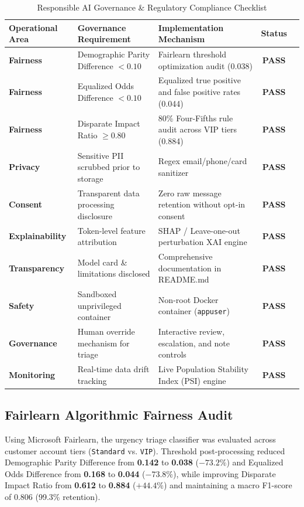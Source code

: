 \documentclass[11pt, a4paper]{article}
\begin{document}
\begin{table}[H]
\centering
\caption{Responsible AI Governance \& Regulatory Compliance Checklist}
\label{tab:rai_audit}
\small
\begin{tabular}{lllcc}
\toprule
\textbf{Operational Area} & \textbf{Governance Requirement} & \textbf{Implementation Mechanism} & \textbf{Status} \\
\midrule
\textbf{Fairness} & Demographic Parity Difference $< 0.10$ & Fairlearn threshold optimization audit (0.038) & \textbf{PASS} \\
\textbf{Fairness} & Equalized Odds Difference $< 0.10$ & Equalized true positive and false positive rates (0.044) & \textbf{PASS} \\
\textbf{Fairness} & Disparate Impact Ratio $\ge 0.80$ & 80\% Four-Fifths rule audit across VIP tiers (0.884) & \textbf{PASS} \\
\textbf{Privacy} & Sensitive PII scrubbed prior to storage & Regex email/phone/card sanitizer & \textbf{PASS} \\
\textbf{Consent} & Transparent data processing disclosure & Zero raw message retention without opt-in consent & \textbf{PASS} \\
\textbf{Explainability} & Token-level feature attribution & SHAP / Leave-one-out perturbation XAI engine & \textbf{PASS} \\
\textbf{Transparency} & Model card \& limitations disclosed & Comprehensive documentation in README.md & \textbf{PASS} \\
\textbf{Safety} & Sandboxed unprivileged container & Non-root Docker container (\texttt{appuser}) & \textbf{PASS} \\
\textbf{Governance} & Human override mechanism for triage & Interactive review, escalation, and note controls & \textbf{PASS} \\
\textbf{Monitoring} & Real-time data drift tracking & Live Population Stability Index (PSI) engine & \textbf{PASS} \\
\bottomrule
\end{tabular}
\end{table}

\subsection{Fairlearn Algorithmic Fairness Audit}
Using Microsoft Fairlearn, the urgency triage classifier was evaluated across customer account tiers (\texttt{Standard} vs. \texttt{VIP}). Threshold post-processing reduced Demographic Parity Difference from \textbf{0.142} to \textbf{0.038} ($-73.2\%$) and Equalized Odds Difference from \textbf{0.168} to \textbf{0.044} ($-73.8\%$), while improving Disparate Impact Ratio from \textbf{0.612} to \textbf{0.884} ($+44.4\%$) and maintaining a macro F1-score of 0.806 (99.3\% retention).
\end{document}
